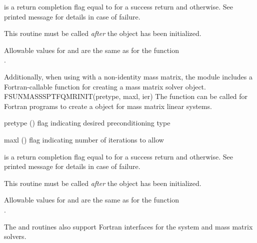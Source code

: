 {
   is a return completion flag equal to  for a success
  return and  otherwise. See printed message for details in case
  of failure.
}
{
  This routine must be called \emph{after} the {\nvector} object has
  been initialized.

  Allowable values for  and  are the same as for
  the {\CC} function \\ \noindent {}.
}
Additionally, when using
{\arkode} with a non-identity mass matrix, the {\sunlinsolsptfqmr} module
includes a Fortran-callable function for creating a
 mass matrix solver object.
{
  FSUNMASSSPTFQMRINIT(pretype, maxl, ier)
}
{
  The function  can be called for Fortran programs
  to create a {\sunlinsolsptfqmr} object for mass matrix linear systems.
}
{
  \begin{args}[pretype]
  \item[pretype] ()
    flag indicating desired preconditioning type
  \item[maxl] ()
    flag indicating number of iterations to allow
  \end{args}
}
{
   is a  return completion flag equal to  for a success
  return and  otherwise. See printed message for details in case
  of failure.
}
{
  This routine must be called \emph{after} the {\nvector} object has
  been initialized.

  Allowable values for  and  are the same as for
  the {\CC} function \\ \noindent {}.
}
The  and
 routines also support Fortran
interfaces for the system and mass matrix solvers.


